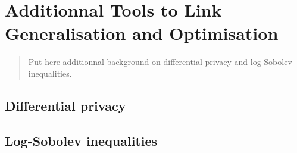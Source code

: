 \chapter[Additionnal Tools to Link Generalisation and Optimisation]{Additionnal Tools to Link \\Generalisation and Optimisation}
\label{chap:other-background}
\addchapterlof
\addchapterloe
\addchapterloa

\minitoc

\begin{abstract}
    Put here additionnal background on differential privacy and log-Sobolev inequalities.
\end{abstract}

\section{Differential privacy}

\section{Log-Sobolev inequalities}